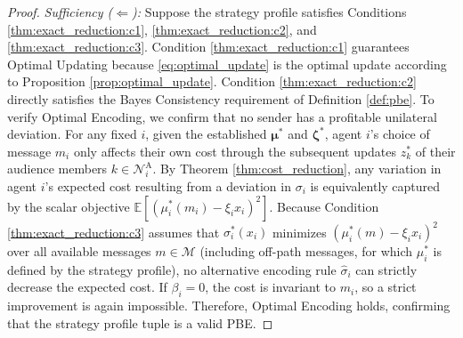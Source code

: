 \documentclass[journal,twoside,web]{ieeecolor}
\begin{document}
\begin{proof}
    \emph{Sufficiency ($\Leftarrow$):} Suppose the strategy profile satisfies Conditions \ref{thm:exact_reduction:c1}, \ref{thm:exact_reduction:c2}, and \ref{thm:exact_reduction:c3}.
    Condition \ref{thm:exact_reduction:c1} guarantees Optimal Updating because \eqref{eq:optimal_update} is the optimal update according to Proposition \ref{prop:optimal_update}.
    Condition \ref{thm:exact_reduction:c2} directly satisfies the Bayes Consistency requirement of Definition \ref{def:pbe}.
    To verify Optimal Encoding, we confirm that no sender has a profitable unilateral deviation. For any fixed $i$, given the established $\bm{\mu}^*$ and $\bm{\zeta}^*$, agent $i$'s choice of message $m_i$ only affects their own cost through the subsequent updates $z_k^*$ of their audience members $k \in \mathcal{N}_i^{\mathrm{A}}$. By Theorem \ref{thm:cost_reduction}, any variation in agent $i$'s expected cost resulting from a deviation in $\sigma_i$ is equivalently captured by the scalar objective $\mathbb{E}[(\mu_i^*(m_i) - \xi_i x_i)^2]$. Because Condition \ref{thm:exact_reduction:c3} assumes that $\sigma_i^*(x_i)$ minimizes $(\mu_i^*(m) - \xi_i x_i)^2$ over all available messages $m \in \mathcal{M}$ (including off-path messages, for which $\mu_i^*$ is defined by the strategy profile), no alternative encoding rule $\widehat{\sigma}_i$ can strictly decrease the expected cost. If $\beta_i = 0$, the cost is invariant to $m_i$, so a strict improvement is again impossible. Therefore, Optimal Encoding holds, confirming that the strategy profile tuple is a valid PBE.
\end{proof}
\end{document}
